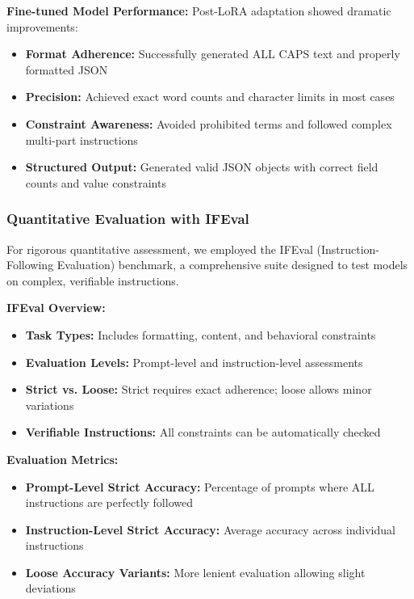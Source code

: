 \textbf{Fine-tuned Model Performance:}
Post-LoRA adaptation showed dramatic improvements:
\begin{itemize}
    \item \textbf{Format Adherence:} Successfully generated ALL CAPS text and properly formatted JSON
    \item \textbf{Precision:} Achieved exact word counts and character limits in most cases
    \item \textbf{Constraint Awareness:} Avoided prohibited terms and followed complex multi-part instructions
    \item \textbf{Structured Output:} Generated valid JSON objects with correct field counts and value constraints
\end{itemize}

\subsubsection{Quantitative Evaluation with IFEval}
For rigorous quantitative assessment, we employed the IFEval (Instruction-Following Evaluation) benchmark, a comprehensive suite designed to test models on complex, verifiable instructions.

\textbf{IFEval Overview:}
\begin{itemize}
    \item \textbf{Task Types:} Includes formatting, content, and behavioral constraints
    \item \textbf{Evaluation Levels:} Prompt-level and instruction-level assessments
    \item \textbf{Strict vs. Loose:} Strict requires exact adherence; loose allows minor variations
    \item \textbf{Verifiable Instructions:} All constraints can be automatically checked
\end{itemize}

\textbf{Evaluation Metrics:}
\begin{itemize}
    \item \textbf{Prompt-Level Strict Accuracy:} Percentage of prompts where ALL instructions are perfectly followed
    \item \textbf{Instruction-Level Strict Accuracy:} Average accuracy across individual instructions
    \item \textbf{Loose Accuracy Variants:} More lenient evaluation allowing slight deviations
\end{itemize}

